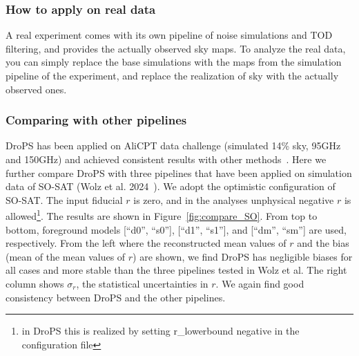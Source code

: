 \documentclass[12pt, a4paper]{ctexart} %
\begin{document}
\subsubsection{How to apply on real data}

A real experiment comes with its own pipeline of noise simulations and TOD filtering, and provides the actually observed sky maps. To analyze the real data, you can simply replace the base simulations with the maps from the simulation pipeline of the experiment, and replace the realization of sky with the actually observed ones.


\subsubsection{Comparing with other pipelines}

DroPS has been applied on AliCPT data challenge (simulated 14\% sky, 95GHz and 150GHz) and achieved consistent results with other methods~\cite{Zhang24}. Here we further compare DroPS with three pipelines that have been applied on simulation data of SO-SAT (Wolz et al. 2024~\cite{SO-SAT}). We adopt the optimistic configuration of SO-SAT. The input fiducial $r$ is zero, and in the analyses unphysical negative $r$ is allowed\footnote{in DroPS this is realized by setting r\_lowerbound negative in the configuration file}.  The results are shown in Figure~\ref{fig:compare_SO}.  From top to bottom, foreground models [``d0'', ``s0''], [``d1'', ``s1''], and [``dm'', ``sm''] are used, respectively. From the left where the reconstructed mean values of $r$ and the bias (mean of the mean values of $r$) are shown, we find DroPS has negligible biases for all cases and more stable than the three pipelines tested in Wolz et al. The right column shows $\sigma_r$, the statistical uncertainties in $r$. We again find good consistency between DroPS and the other pipelines.
\end{document}
